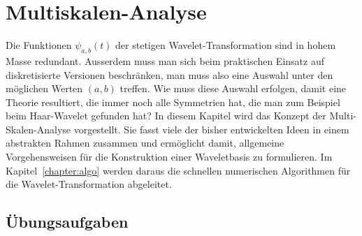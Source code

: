 %
%
%
\chapter{Multiskalen-Analyse
\label{chapter:msa}}
Die Funktionen $\psi_{a,b}(t)$ der stetigen Wavelet-Transformation
sind in hohem Masse redundant.
Ausserdem muss man sich beim praktischen Einsatz auf diskretisierte 
Versionen beschränken, man muss also eine Auswahl unter den möglichen
Werten $(a,b)$ treffen.
Wie muss diese Auswahl erfolgen, damit eine Theorie resultiert, die
immer noch alle Symmetrien hat, die man zum Beispiel beim Haar-Wavelet
gefunden hat?
In diesem Kapitel wird das Konzept der Multi-Skalen-Analyse vorgestellt.
Sie fasst viele der bisher entwickelten Ideen in einem abstrakten
Rahmen zusammen und ermöglicht damit, allgemeine Vorgehensweisen für die
Konstruktion einer Waveletbasis zu formulieren.
Im Kapitel~\ref{chapter:algo} werden daraus die schnellen numerischen
Algorithmen für die Wavelet-Transformation abgeleitet.





\section*{Übungsaufgaben}

